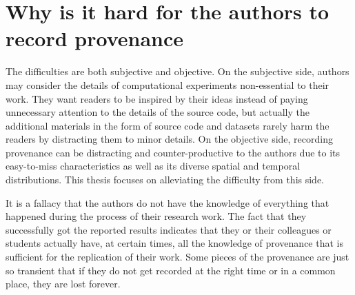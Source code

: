 \section{Why is it hard for the authors to record provenance}
The difficulties are both subjective and objective. On the subjective side, authors may consider the details of computational experiments non-essential to their work. They want readers to be inspired by their ideas instead of paying unnecessary attention to the details of the source code, but actually the additional materials in the form of source code and datasets rarely harm the readers by distracting them to minor details. On the objective side, recording provenance can be distracting and counter-productive to the authors due to its easy-to-miss characteristics as well as its diverse spatial and temporal distributions. This thesis focuses on alleviating the difficulty from this side.

It is a fallacy that the authors do not have the knowledge of everything that happened during the process 
of their research work. The fact that they successfully got the reported results indicates that they or their colleagues or students  
actually have, at certain times, all the knowledge of provenance that is sufficient for the 
replication of their work. Some pieces of the provenance are just so transient that if they do not 
get recorded at the right time or in a common place, they are lost forever.

